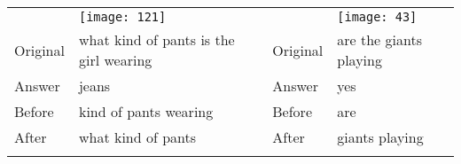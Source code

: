\begin{figure*}
\begin{tabular}{lp{}lp{}}
& \texttt{[image: 121]}     & & \texttt{[image: 43]}\\
Original & what kind of pants is the girl wearing & Original & are the giants playing \\
Answer & jeans                          & Answer & yes \\
Before & kind of pants wearing          & Before & are \\
After & what kind of pants              & After & giants playing \\\hline\\

\end{tabular}
\end{figure*}